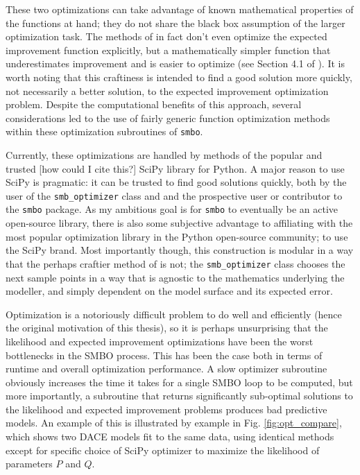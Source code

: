 These two optimizations can take advantage of known mathematical properties of the functions at hand; they do not share the black box assumption of the larger optimization task. The methods of \cite{jones_efficient_1998} in fact don't even optimize the expected improvement function explicitly, but a mathematically simpler function that underestimates improvement and is easier to optimize (see Section 4.1 of \cite{jones_efficient_1998}). It is worth noting that this craftiness is intended to find a good solution more quickly, not necessarily a better solution, to the expected improvement optimization problem. Despite the computational benefits of this approach, several considerations led to the use of fairly generic function optimization methods within these optimization subroutines of \texttt{smbo}.

Currently, these optimizations are handled by methods of the popular and trusted [how could I cite this?] SciPy library for Python. A major reason to use SciPy is pragmatic: it can be trusted to find good solutions quickly, both by the user of the \texttt{smb\_optimizer} class and and the prospective user or contributor to the \texttt{smbo} package. As my ambitious goal is for \texttt{smbo} to eventually be an active open-source library, there is also some subjective advantage to affiliating with the most popular optimization library in the Python open-source community; to use the SciPy brand. Most importantly though, this construction is modular in a way that the perhaps craftier method of \citep{jones_efficient_1998} is not; the \texttt{smb\_optimizer} class chooses the next sample points in a way that is agnostic to the mathematics underlying the modeller, and simply dependent on the model surface and its expected error. 

Optimization is a notoriously difficult problem to do well and efficiently (hence the original motivation of this thesis), so it is perhaps unsurprising that the likelihood and expected improvement optimizations have been the worst bottlenecks in the SMBO process. This has been the case both in terms of runtime and overall optimization performance. A slow optimizer subroutine obviously increases the time it takes for a single SMBO loop to be computed, but more importantly, a subroutine that returns significantly sub-optimal solutions to the likelihood and expected improvement problems produces bad predictive models. An example of this is illustrated by example in Fig. \ref{fig:opt_compare}, which shows two DACE models fit to the same data, using identical methods except for specific choice of SciPy optimizer to maximize the likelihood of parameters $P$ and $Q$.

